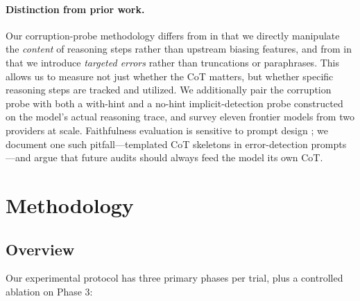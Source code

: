 \documentclass{article}
\begin{document}
\paragraph{Distinction from prior work.} Our corruption-probe methodology differs from \citet{turpin2023language} in that we directly manipulate the \emph{content} of reasoning steps rather than upstream biasing features, and from \citet{lanham2023measuring} in that we introduce \emph{targeted errors} rather than truncations or paraphrases. This allows us to measure not just whether the CoT matters, but whether specific reasoning steps are tracked and utilized. We additionally pair the corruption probe with both a with-hint and a no-hint implicit-detection probe constructed on the model's actual reasoning trace, and survey eleven frontier models from two providers at scale. Faithfulness evaluation is sensitive to prompt design \citep{atanasova2023faithfulness}; we document one such pitfall---templated CoT skeletons in error-detection prompts---and argue that future audits should always feed the model its own CoT.

\section{Methodology}
\label{sec:method}

\subsection{Overview}

Our experimental protocol has three primary phases per trial, plus a controlled ablation on Phase 3:
\end{document}
